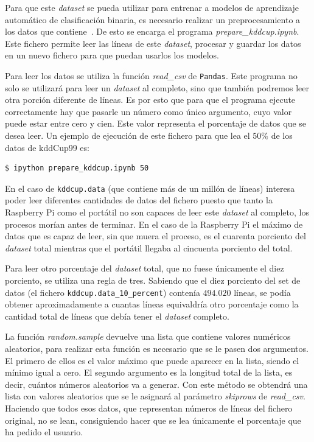 \documentclass[a4paper, 12pt]{book}
\begin{document}
Para que este \textit{dataset} se pueda utilizar para entrenar a modelos de aprendizaje automático de clasificación binaria, es necesario realizar un preprocesamiento a los datos que contiene~\cite{Pyle1999,Dasu2003}. De esto se encarga el programa \textit{prepare\_kddcup.ipynb}. Este fichero permite leer las líneas de este \textit{dataset}, procesar y guardar los datos en un nuevo fichero para que puedan usarlos los modelos.

Para leer los datos se utiliza la función \textit{read\_csv} de \texttt{Pandas}. Este programa no solo se utilizará para leer un \textit{dataset} al completo, sino que también podremos leer otra porción diferente de líneas. Es por esto que para que el programa ejecute correctamente hay que pasarle un número como único argumento, cuyo valor puede estar entre cero y cien. Este valor representa el porcentaje de datos que se desea leer. Un ejemplo de ejecución de este fichero para que lea el $50\%$ de los datos de kddCup99 es:\\

\begin{lstlisting}[language=bash]
    $ ipython prepare_kddcup.ipynb 50
\end{lstlisting}

En el caso de \texttt{kddcup.data} (que contiene más de un millón de líneas) interesa poder leer diferentes cantidades de datos del fichero puesto que tanto la Raspberry Pi como el portátil no son capaces de leer este \textit{dataset} al completo, los procesos morían antes de terminar. En el caso de la Raspberry Pi el máximo de datos que es capaz de leer, sin que muera el proceso, es el cuarenta porciento del \textit{dataset} total mientras que el portátil llegaba al cincuenta porciento del total.

Para leer otro porcentaje del \textit{dataset} total, que no fuese únicamente el diez porciento, se utiliza una regla de tres. Sabiendo que el diez porciento del set de datos (el fichero \texttt{kddcup.data\_10\_percent}) contenía $494.020$ líneas, se podía obtener aproximadamente a cuantas líneas equivaldría otro porcentaje como la cantidad total de líneas que debía tener el \textit{dataset} completo.

La función \textit{random.sample} devuelve una lista que contiene valores numéricos aleatorios, para realizar esta función es necesario que se le pasen dos argumentos. El primero de ellos es el valor máximo que puede aparecer en la lista, siendo el mínimo igual a cero. El segundo argumento es la longitud total de la lista, es decir, cuántos números aleatorios va a generar. Con este método se obtendrá una lista con valores aleatorios que se le asignará al parámetro \textit{skiprows} de \textit{read\_csv}. Haciendo que todos esos datos, que representan números de líneas del fichero original, no se lean, consiguiendo hacer que se lea únicamente el porcentaje que ha pedido el usuario.
\end{document}
